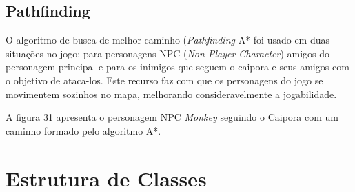 	
	
\subsection{Pathfinding}
O algoritmo de busca de melhor caminho (\textit{Pathfinding} A* foi usado em duas situações no jogo; para personagens NPC (\textit{Non-Player Character}) amigos do personagem principal e para os inimigos que seguem o caipora e seus amigos com o objetivo de ataca-los.  Este recurso faz com que os personagens do jogo se movimentem sozinhos no mapa, melhorando consideravelmente a jogabilidade.


A figura 31 apresenta o personagem NPC \textit{Monkey} seguindo o Caipora com um caminho formado pelo algoritmo A*.

\begin{figure}[h!]
		\centering
	\end{figure}
	
	
	
	
	\section{Estrutura de Classes}
	
	\begin{figure}[h!]
		\centering
	\end{figure}
	

